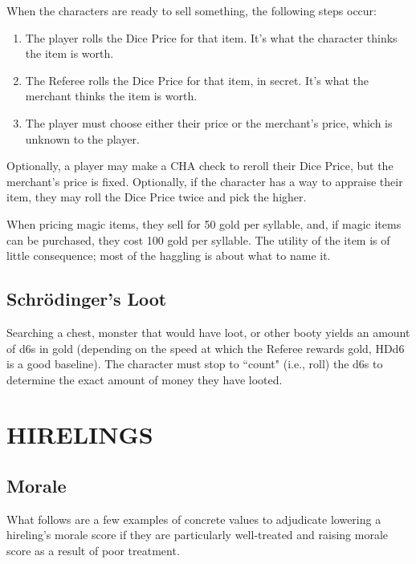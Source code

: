 \documentclass[twoside]{article}
\begin{document}
\bigbreak

When the characters are ready to sell something, the following steps occur:

\begin{enumerate}[nosep]
\item The player rolls the Dice Price for that item. It's what the character thinks the item is worth.
\item The Referee rolls the Dice Price for that item, in secret. It's what the merchant thinks the item is worth.
\item The player must choose either their price or the merchant's price, which is unknown to the player.
\end{enumerate}

Optionally, a player may make a CHA check to reroll their Dice Price, but the merchant's price is fixed. Optionally, if the character has a way to appraise their item, they may roll the Dice Price twice and pick the higher.

\bigbreak

When pricing magic items, they sell for 50 gold per syllable, and, if magic items can be purchased, they cost 100 gold per syllable. The utility of the item is of little consequence; most of the haggling is about what to name it.

\subsection*{Schr\"odinger's Loot}

Searching a chest, monster that would have loot, or other booty yields an amount of d6s in gold (depending on the speed at which the Referee rewards gold, HDd6 is a good baseline). The character must stop to ``count" (i.e., roll) the d6s to determine the exact amount of money they have looted.

\section*{HIRELINGS}

\subsection*{Morale}

What follows are a few examples of concrete values to adjudicate lowering a hireling's morale score if they are particularly well-treated and raising morale score as a result of poor treatment.
\end{document}
